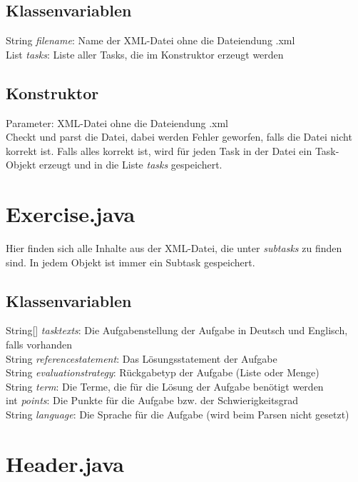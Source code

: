 \documentclass[11pt]{report}
\begin{document}
\subsection*{Klassenvariablen}

String \textit{filename}: Name der XML-Datei ohne die Dateiendung \grqq .xml\grqq\  \\
List \textit{tasks}: Liste aller Tasks, die im Konstruktor erzeugt werden

\subsection*{Konstruktor}

Parameter: XML-Datei ohne die Dateiendung \grqq .xml\grqq\ \\
Checkt und parst die Datei, dabei werden Fehler geworfen, falls die Datei nicht korrekt ist.
Falls alles korrekt ist, wird für jeden Task in der Datei ein Task-Objekt erzeugt und in die Liste \textit{tasks} gespeichert.

\section{Exercise.java}

Hier finden sich alle Inhalte aus der XML-Datei, die unter \textit{subtasks} zu finden sind. In jedem Objekt ist immer ein Subtask gespeichert.

\subsection*{Klassenvariablen}

String[] \textit{tasktexts}: Die Aufgabenstellung der Aufgabe in Deutsch und Englisch, falls vorhanden \\
String \textit{referencestatement}: Das Lösungsstatement der Aufgabe \\
String \textit{evaluationstrategy}: Rückgabetyp der Aufgabe (Liste oder Menge) \\
String \textit{term}: Die Terme, die für die Lösung der Aufgabe benötigt werden \\
int \textit{points}: Die Punkte für die Aufgabe bzw. der Schwierigkeitsgrad \\
String \textit{language}: Die Sprache für die Aufgabe (wird beim Parsen nicht gesetzt)

\section{Header.java}
\end{document}
